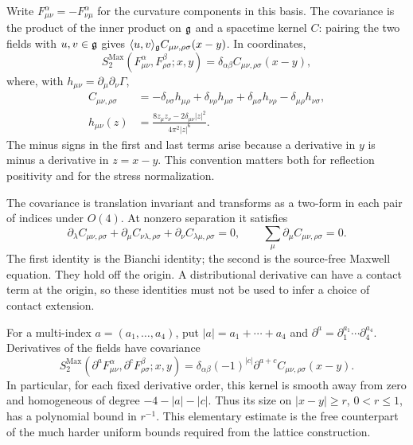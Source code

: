 Write $F^\alpha_{\mu\nu}=-F^\alpha_{\nu\mu}$ for the curvature
components in this basis. The covariance is the product of the inner
product on $\mathfrak g$ and a spacetime kernel $C$: pairing the two fields
with $u,v\in\mathfrak g$ gives $\langle u,v\rangle_{\mathfrak g}C_{\mu\nu,\rho\sigma}(x-y)$.
In coordinates,
\begin{equation}\label{ch03:curvature}
 S^{\mathrm{Max}}_2(F^\alpha_{\mu\nu},F^\beta_{\rho\sigma};x,y)
 =\delta_{\alpha\beta}C_{\mu\nu,\rho\sigma}(x-y),
\end{equation}
where, with $h_{\mu\nu}=\partial_\mu\partial_\nu\Gamma$,
\begin{align}
 C_{\mu\nu,\rho\sigma}
 &=-\delta_{\nu\sigma}h_{\mu\rho}
   +\delta_{\nu\rho}h_{\mu\sigma}
   +\delta_{\mu\sigma}h_{\nu\rho}
   -\delta_{\mu\rho}h_{\nu\sigma},\label{ch03:kernel}\\
 h_{\mu\nu}(z)
 &=\frac{8z_\mu z_\nu-2\delta_{\mu\nu}|z|^2}
          {4\pi^2|z|^6}.\label{ch03:hessian}
\end{align}
The minus signs in the first and last terms arise because a derivative
in $y$ is minus a derivative in $z=x-y$. This convention matters both
for reflection positivity and for the stress normalization.

The covariance is translation invariant and transforms as a two-form in
each pair of indices under $O(4)$. At nonzero separation it satisfies
\begin{equation}\label{ch03:maxwell-equations}
 \partial_\lambda C_{\mu\nu,\rho\sigma}
 +\partial_\mu C_{\nu\lambda,\rho\sigma}
 +\partial_\nu C_{\lambda\mu,\rho\sigma}=0,
 \qquad
 \sum_\mu\partial_\mu C_{\mu\nu,\rho\sigma}=0.
\end{equation}
The first identity is the Bianchi identity; the second is the source-free
Maxwell equation. They hold off the origin. A distributional derivative
can have a contact term at the origin, so these identities must not be
used to infer a choice of contact extension.

For a multi-index $a=(a_1,\ldots,a_4)$, put
$|a|=a_1+\cdots+a_4$ and
$\partial^a=\partial_1^{a_1}\cdots\partial_4^{a_4}$.
Derivatives of the fields have covariance
\begin{equation}\label{ch03:jet-covariance}
 S^{\mathrm{Max}}_2(\partial^aF^\alpha_{\mu\nu},
                   \partial^cF^\beta_{\rho\sigma};x,y)
 =\delta_{\alpha\beta}(-1)^{|c|}
       \partial^{a+c}C_{\mu\nu,\rho\sigma}(x-y).
\end{equation}
In particular, for each fixed derivative order, this kernel is smooth
away from zero and homogeneous of degree $-4-|a|-|c|$. Thus its size on
$|x-y|\ge r$, $0<r\le1$, has a polynomial bound in $r^{-1}$.
This elementary estimate is the free counterpart of the much harder
uniform bounds required from the lattice construction.

